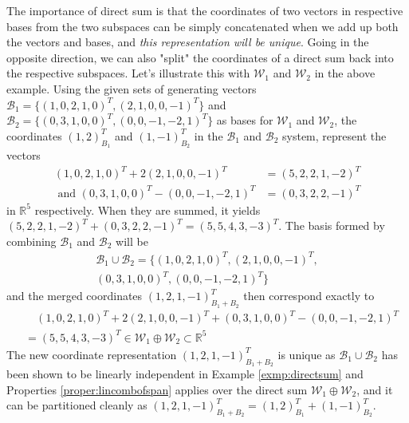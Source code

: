 The importance of direct sum is that the coordinates of two vectors in respective bases from the two subspaces can be simply concatenated when we add up both the vectors and bases, and \textit{this representation will be unique}. Going in the opposite direction, we can also "split" the coordinates of a direct sum back into the respective subspaces. Let's illustrate this with $\mathcal{W}_1$ and $\mathcal{W}_2$ in the above example. Using the given sets of generating vectors $\mathcal{B}_1 = \{(1,0,2,1,0)^T, (2,1,0,0,-1)^T\}$ and $\mathcal{B}_2 = \{(0,3,1,0,0)^T, (0,0,-1,-2,1)^T\}$ as bases for $\mathcal{W}_1$ and $\mathcal{W}_2$, the coordinates $(1,2)_{B_1}^T$ and $(1,-1)_{B_2}^T$ in the $\mathcal{B}_1$ and $\mathcal{B}_2$ system, represent the vectors 
\begin{align*}
(1,0,2,1,0)^T + 2(2,1,0,0,-1)^T &= (5,2,2,1,-2)^T \\
\text{ and } (0,3,1,0,0)^T - (0,0,-1,-2,1)^T &= (0,3,2,2,-1)^T
\end{align*}
in $\mathbb{R}^5$ respectively. When they are summed, it yields $(5,2,2,1,-2)^T + (0,3,2,2,-1)^T = (5,5,4,3,-3)^T$. The basis formed by combining $\mathcal{B}_1$ and $\mathcal{B}_2$ will be
\begin{align*}
\mathcal{B}_1 \cup \mathcal{B}_2 = \{(1,0,2,1,0)^T, (2,1,0,0,-1)^T, \\ (0,3,1,0,0)^T,  (0,0,-1,-2,1)^T\}
\end{align*}
and the merged coordinates $(1,2,1,-1)_{B_1+B_2}^T$ then correspond exactly to
\begin{align*}
&\quad (1,0,2,1,0)^T + 2(2,1,0,0,-1)^T + (0,3,1,0,0)^T - (0,0,-1,-2,1)^T \\
&= (5,5,4,3,-3)^T \in \mathcal{W}_1 \oplus \mathcal{W}_2 \subset \mathbb{R}^5
\end{align*}
The new coordinate representation $(1,2,1,-1)_{B_1+B_2}^T$ is unique as $\mathcal{B}_1 \cup \mathcal{B}_2$ has been shown to be linearly independent in Example \ref{exmp:directsum} and Properties \ref{proper:lincombofspan} applies over the direct sum $\mathcal{W}_1 \oplus \mathcal{W}_2$, and it can be partitioned cleanly as $(1,2,1,-1)_{B_1+B_2}^T = (1,2)_{B_1}^T + (1,-1)_{B_2}^T$.

